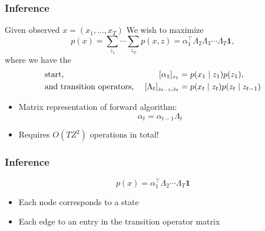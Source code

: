 \documentclass{beamer}
\begin{document}
\begin{frame}
\frametitle{Inference}
Given observed $x = (x_1, \ldots, x_T)$
\vspace{1em}
We wish to maximize
\begin{equation*}
p(x)
= \sum_{z_1}\cdots\sum_{z_T}p(x, z)
= \alpha_1^\top\Lambda_2\Lambda_3\cdots\Lambda_T\bm1,
\end{equation*}
where we have the
\begin{align*}
&\textnormal{start, } & [\alpha_1]_{z_1} &= p(x_1\mid z_1)p(z_1),\\
&\textnormal{and transition operators, }
    & [\Lambda_t]_{z_{t-1},z_t} &= p(x_t \mid z_t)p(z_t \mid z_{t-1})
\end{align*}

\begin{itemize}
\item Matrix representation of forward algorithm:
$$\alpha_t = \alpha_{t-1}\Lambda_t$$
\item Requires $O(TZ^2)$ operations in total!
\end{itemize}
\end{frame}

\begin{frame}
\frametitle{Inference}
$$p(x) = \alpha_1^\top\Lambda_2\cdots\Lambda_T\mathbf{1}$$
\begin{figure}
\begin{center}
\resizebox{0.8\width}{0.8\height}{

}
\end{center}
\end{figure}
\vspace{-1em}
\begin{itemize}
    \item Each node corresponds to a state
    \item Each edge to an entry in the transition operator matrix
\end{itemize}
\end{frame}
\end{document}
